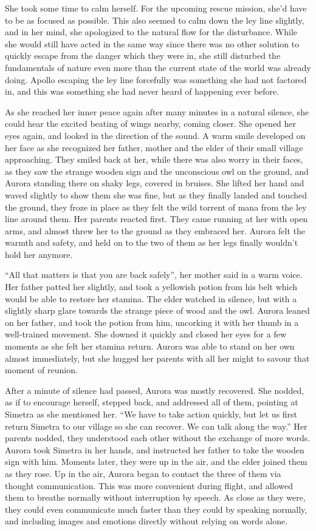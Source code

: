 She took some time to calm herself. For the upcoming rescue mission, she'd have to be as focused as possible. This also seemed to calm down the ley line slightly, and in her mind, she apologized to the natural flow for the disturbance. While she would still have acted in the same way since there was no other solution to quickly escape from the danger which they were in, she still disturbed the fundamentals of nature even more than the current state of the world was already doing. Apollo escaping the ley line forcefully was something she had not factored in, and this was something she had never heard of happening ever before.

As she reached her inner peace again after many minutes in a natural silence, she could hear the excited beating of wings nearby, coming closer. She opened her eyes again, and looked in the direction of the sound. A warm smile developed on her face as she recognized her father, mother and the elder of their small village approaching. They smiled back at her, while there was also worry in their faces, as they saw the strange wooden sign and the unconscious owl on the ground, and Aurora standing there on shaky legs, covered in bruises. She lifted her hand and waved slightly to show them she was fine, but as they finally landed and touched the ground, they froze in place as they felt the wild torrent of mana from the ley line around them. Her parents reacted first. They came running at her with open arms, and almost threw her to the ground as they embraced her. Aurora felt the warmth and safety, and held on to the two of them as her legs finally wouldn't hold her anymore. 

\enquote{All that matters is that you are back safely}, her mother said in a warm voice. Her father patted her slightly, and took a yellowish potion from his belt which would be able to restore her stamina. The elder watched in silence, but with a slightly sharp glare towards the strange piece of wood and the owl. Aurora leaned on her father, and took the potion from him, uncorking it with her thumb in a well-trained movement. She downed it quickly and closed her eyes for a few moments as she felt her stamina return. Aurora was able to stand on her own almost immediately, but she hugged her parents with all her might to savour that moment of reunion.

After a minute of silence had passed, Aurora was mostly recovered. She nodded, as if to encourage herself, stepped back, and addressed all of them, pointing at Simetra as she mentioned her. \enquote{We have to take action quickly, but let us first return Simetra to our village so she can recover. We can talk along the way.}
Her parents nodded, they understood each other without the exchange of more words. Aurora took Simetra in her hands, and instructed her father to take the wooden sign with him. Moments later, they were up in the air, and the elder joined them as they rose. Up in the air, Aurora began to contact the three of them via thought communication. This was more convenient during flight, and allowed them to breathe normally without interruption by speech. As close as they were, they could even communicate much faster than they could by speaking normally, and including images and emotions directly without relying on words alone.

